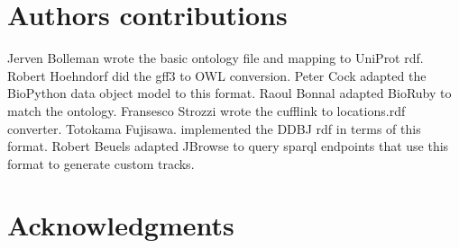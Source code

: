 \documentclass[10pt]{bmc_article}
\newenvironment{bmcformat}{\begin{raggedright}\baselineskip20pt\sloppy\setboolean{publ}{false}}{\end{raggedright}\baselineskip20pt\sloppy}
\begin{document}
\begin{bmcformat}
\section{Authors contributions}

Jerven Bolleman wrote the basic ontology file and mapping to UniProt rdf. Robert Hoehndorf did the gff3 to OWL conversion. Peter Cock adapted the BioPython data object model to this format. Raoul Bonnal adapted BioRuby to match the ontology. Fransesco Strozzi wrote the cufflink to locations.rdf converter. Totokama Fujisawa. implemented the DDBJ rdf in terms of this format. Robert Beuels adapted JBrowse to query sparql endpoints that use this format to generate custom tracks. 

\section{Acknowledgments}



\newpage
{
   }     %
  
\end{bmcformat}
\end{document}
